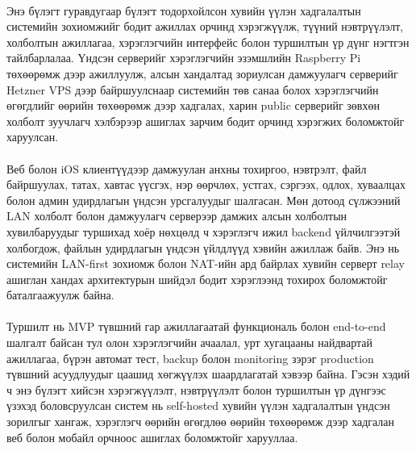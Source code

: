 \paragraph{}
Энэ бүлэгт гуравдугаар бүлэгт тодорхойлсон хувийн үүлэн хадгалалтын системийн зохиомжийг бодит ажиллах орчинд хэрэгжүүлж, түүний нэвтрүүлэлт, холболтын ажиллагаа, хэрэглэгчийн интерфейс болон туршилтын үр дүнг нэгтгэн тайлбарлалаа. Үндсэн серверийг хэрэглэгчийн эзэмшлийн Raspberry Pi төхөөрөмж дээр ажиллуулж, алсын хандалтад зориулсан дамжуулагч серверийг Hetzner VPS дээр байршуулснаар системийн төв санаа болох хэрэглэгчийн өгөгдлийг өөрийн төхөөрөмж дээр хадгалах, харин public серверийг зөвхөн холболт зуучлагч хэлбэрээр ашиглах зарчим бодит орчинд хэрэгжих боломжтойг харуулсан.

\paragraph{}
Веб болон iOS клиентүүдээр дамжуулан анхны тохиргоо, нэвтрэлт, файл байршуулах, татах, хавтас үүсгэх, нэр өөрчлөх, устгах, сэргээх, одлох, хуваалцах болон админ удирдлагын үндсэн урсгалуудыг шалгасан. Мөн дотоод сүлжээний LAN холболт болон дамжуулагч серверээр дамжих алсын холболтын хувилбаруудыг туршихад хоёр нөхцөлд ч хэрэглэгч ижил backend үйлчилгээтэй холбогдож, файлын удирдлагын үндсэн үйлдлүүд хэвийн ажиллаж байв. Энэ нь системийн LAN-first зохиомж болон NAT-ийн ард байрлах хувийн серверт relay ашиглан хандах архитектурын шийдэл бодит хэрэглээнд тохирох боломжтойг баталгаажуулж байна.

\paragraph{}
Туршилт нь MVP түвшний гар ажиллагаатай функциональ болон end-to-end шалгалт байсан тул олон хэрэглэгчийн ачаалал, урт хугацааны найдвартай ажиллагаа, бүрэн автомат тест, backup болон monitoring зэрэг production түвшний асуудлуудыг цаашид хөгжүүлэх шаардлагатай хэвээр байна. Гэсэн хэдий ч энэ бүлэгт хийсэн хэрэгжүүлэлт, нэвтрүүлэлт болон туршилтын үр дүнгээс үзэхэд боловсруулсан систем нь self-hosted хувийн үүлэн хадгалалтын үндсэн зорилгыг хангаж, хэрэглэгч өөрийн өгөгдлөө өөрийн төхөөрөмж дээр хадгалан веб болон мобайл орчноос ашиглах боломжтойг харууллаа.
